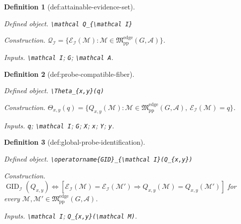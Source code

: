 \documentclass{article}
\newtheorem{definition}{Definition}
\begin{document}
\begin{definition}[def:attainable-evidence-set]\label{def:attainable-evidence-set}
\par\smallskip\noindent\emph{Defined object.} \texttt{\textbackslash{}\allowbreak{}mathcal Q\_\allowbreak{}\{\textbackslash{}\allowbreak{}mathcal I\}\allowbreak{}}
\par\smallskip\noindent\emph{Construction.} \(\mathcal Q_{\mathcal I}=\{\mathcal E_{\mathcal I}(\mathcal M):\mathcal M\in\mathfrak M_{\mathrm{pp}}^{\mathrm{edge}}(G,\mathcal A)\}\).
\par\smallskip\noindent\emph{Inputs.} \texttt{\textbackslash{}\allowbreak{}mathcal I}; \texttt{G}; \texttt{\textbackslash{}\allowbreak{}mathcal A}.
\end{definition}

\begin{definition}[def:probe-compatible-fiber]\label{def:probe-compatible-fiber}
\par\smallskip\noindent\emph{Defined object.} \texttt{\textbackslash{}\allowbreak{}Theta\_\allowbreak{}\{x,\allowbreak{}y\}\allowbreak{}(q)}
\par\smallskip\noindent\emph{Construction.} \(\Theta_{x,y}(q)=\{Q_{x,y}(\mathcal M):\mathcal M\in\mathfrak M_{\mathrm{pp}}^{\mathrm{edge}}(G,\mathcal A),\ \mathcal E_{\mathcal I}(\mathcal M)=q\}\).
\par\smallskip\noindent\emph{Inputs.} \texttt{q}; \texttt{\textbackslash{}\allowbreak{}mathcal I}; \texttt{G}; \texttt{X}; \texttt{x}; \texttt{Y}; \texttt{y}.
\end{definition}

\begin{definition}[def:global-probe-identification]\label{def:global-probe-identification}
\par\smallskip\noindent\emph{Defined object.} \texttt{\textbackslash{}\allowbreak{}operatorname\{GID\}\allowbreak{}\_\allowbreak{}\{\textbackslash{}\allowbreak{}mathcal I\}\allowbreak{}(Q\_\allowbreak{}\{x,\allowbreak{}y\}\allowbreak{})}
\par\smallskip\noindent\emph{Construction.} \(\operatorname{GID}_{\mathcal I}(Q_{x,y})\Longleftrightarrow[\mathcal E_{\mathcal I}(\mathcal M)=\mathcal E_{\mathcal I}(\mathcal M')\Rightarrow Q_{x,y}(\mathcal M)=Q_{x,y}(\mathcal M')]\) for every \(\mathcal M,\mathcal M'\in\mathfrak M_{\mathrm{pp}}^{\mathrm{edge}}(G,\mathcal A)\).
\par\smallskip\noindent\emph{Inputs.} \texttt{\textbackslash{}\allowbreak{}mathcal I}; \texttt{Q\_\allowbreak{}\{x,\allowbreak{}y\}\allowbreak{}(\textbackslash{}\allowbreak{}mathcal M)}.
\end{definition}
\end{document}
